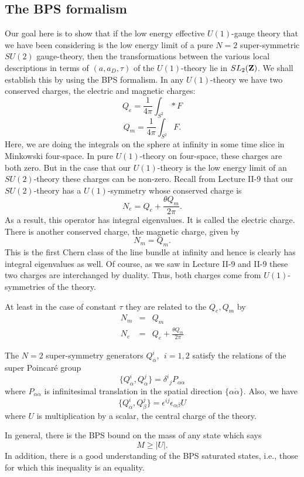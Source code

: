 \documentclass[10pt]{article}
\begin{document}
\subsection{The BPS formalism}

Our goal here is to show that if the low energy effective $U(1)$-gauge
theory that we have 
been considering is the low energy limit of a pure $N=2$ super-symmetric
$SU(2)$ gauge-theory, then the transformations between the various local
descriptions in terms of $(a,a_D,\tau)$ of the $U(1)$-theory lie in
$SL_2({\bf Z})$. 
We shall establish this by using the BPS formalism.  In any
$U(1)$-theory we have two conserved charges, the electric and
magnetic charges: 
$$Q_e=\frac{1}{4\pi}\int_{S^2}*F$$
$$Q_m=\frac{1}{4\pi}\int_{S^2}F.$$
Here, we are doing the integrals on the sphere at infinity in some
time slice in Minkowski four-space. 
In pure $U(1)$-theory on four-space, these charges are both zero.
But in the case that our $U(1)$-theory is the low energy limit of an
$SU(2)$-theory these charges can be non-zero.
Recall from Lecture II-9 that our $SU(2)$-theory has a $U(1)$-symmetry
whose conserved charge is 
$$N_e=Q_e+\frac{\theta Q_m}{2\pi}.$$
As a result, this operator has integral eigenvalues.  It is called the
electric charge.
There is another conserved charge, the magnetic charge, given by
$$N_m=Q_m.$$
This is the first Chern class of the line bundle at infinity and
hence is clearly has integral eigenvalues as well.
Of course, as we saw in Lecture II-9 and II-9 these two charges are
interchanged by duality. Thus, both charges come from
$U(1)$-symmetries of the theory. 


At least
in the case of constant $\tau$ they are related to the $Q_e,Q_m$ by
\begin{eqnarray*}
N_m & = & Q_m \\
N_e & = & Q_e+\frac{\theta Q_m}{2\pi}
\end{eqnarray*}

The $N=2$ super-symmetry generators $Q_\alpha^i, \ \ i=1,2$ 
satisfy the relations of the super Poincar\'e group
$$\{Q_\alpha^i,Q_{\dot\alpha}^j\}=\delta^i{}_jP_{\alpha\dot\alpha}$$
where $P_{\alpha\dot\alpha}$ is infinitesimal translation in the
spatial direction $\{\alpha\dot\alpha\}$. Also, we have
$$\{Q_\alpha^i,Q_\beta^j\}=\epsilon^{ij}\epsilon_{\alpha\beta}U$$
where $U$ is  multiplication by a scalar, the central charge of the
theory. 

In general, there is the BPS bound on the mass of any state
which says
$$M\ge |U|.$$
In addition, there is a good understanding of the BPS saturated
states, i.e., those for which this inequality is an equality.
\end{document}
